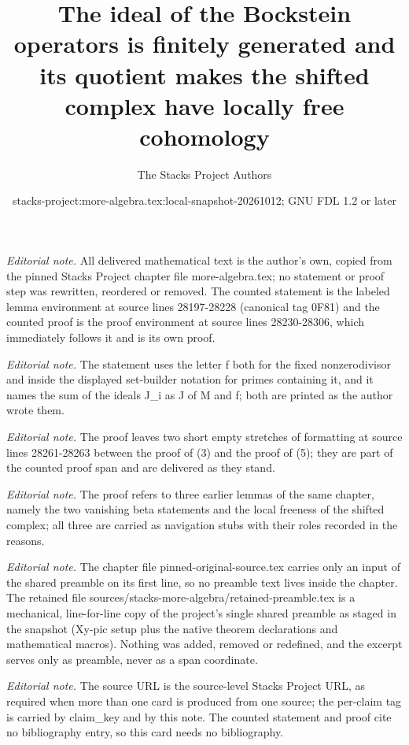 \documentclass[10pt,a4paper]{amsart}
\title{The ideal of the Bockstein operators is finitely generated and its quotient makes the shifted complex have locally free cohomology}
\author{The Stacks Project Authors}
\date{stacks-project:more-algebra.tex:local-snapshot-20261012; GNU FDL 1.2 or later}
\theoremstyle{plain}
\theoremstyle{definition}
\theoremstyle{remark}
\numberwithin{equation}{subsection}
\begin{document}
\maketitle
\setcounter{subsection}{1}
\noindent\textit{Editorial note.} All delivered mathematical text is the author's own, copied from the pinned Stacks Project chapter file more-algebra.tex; no statement or proof step was rewritten, reordered or removed. The counted statement is the labeled lemma environment at source lines 28197-28228 (canonical tag 0F81) and the counted proof is the proof environment at source lines 28230-28306, which immediately follows it and is its own proof.\par\medskip
\noindent\textit{Editorial note.} The statement uses the letter f both for the fixed nonzerodivisor and inside the displayed set-builder notation for primes containing it, and it names the sum of the ideals J\_i as J of M and f; both are printed as the author wrote them.\par\medskip
\noindent\textit{Editorial note.} The proof leaves two short empty stretches of formatting at source lines 28261-28263 between the proof of (3) and the proof of (5); they are part of the counted proof span and are delivered as they stand.\par\medskip
\noindent\textit{Editorial note.} The proof refers to three earlier lemmas of the same chapter, namely the two vanishing beta statements and the local freeness of the shifted complex; all three are carried as navigation stubs with their roles recorded in the reasons.\par\medskip
\noindent\textit{Editorial note.} The chapter file pinned-original-source.tex carries only an input of the shared preamble on its first line, so no preamble text lives inside the chapter. The retained file sources/stacks-more-algebra/retained-preamble.tex is a mechanical, line-for-line copy of the project's single shared preamble as staged in the snapshot (Xy-pic setup plus the native theorem declarations and mathematical macros). Nothing was added, removed or redefined, and the excerpt serves only as preamble, never as a span coordinate.\par\medskip
\noindent\textit{Editorial note.} The source URL is the source-level Stacks Project URL, as required when more than one card is produced from one source; the per-claim tag is carried by claim\_key and by this note. The counted statement and proof cite no bibliography entry, so this card needs no bibliography.\par\medskip
\end{document}
